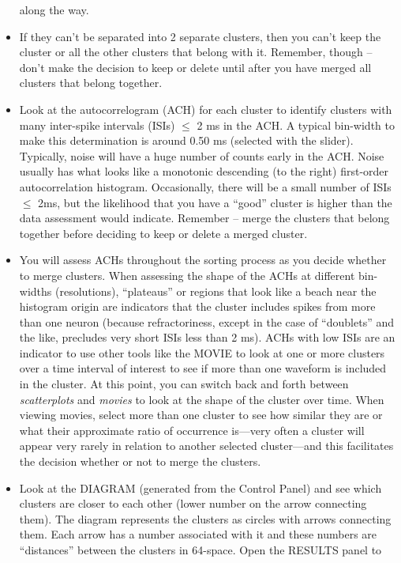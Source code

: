 \documentclass[12pt]{article}
\begin{document}
\begin{itemize}
  along the way.
\item If they can't be separated into 2 separate clusters, then you
  can't keep the cluster or all the other clusters that belong with
  it. Remember, though -- don't make the decision to keep or delete
  until after you have merged all clusters that belong together.
\item Look at the autocorrelogram (ACH) for each cluster to identify
  clusters with many inter-spike intervals (ISIs) ${\leq}$ 2 ms in the
  ACH. A typical bin-width to make this determination is around 0.50
  ms (selected with the slider).  Typically, noise will have a huge
  number of counts early in the ACH. Noise usually has what looks like
  a monotonic descending (to the right) first-order autocorrelation
  histogram. Occasionally, there will be a small number of ISIs
  ${\leq}$ 2ms, but the likelihood that you have a ``good'' cluster is
  higher than the data assessment would indicate.  Remember -- merge
  the clusters that belong together before deciding to keep or delete
  a merged cluster.
\item You will assess ACHs throughout the sorting process as you
  decide whether to merge clusters. When assessing the shape of the
  ACHs at different bin-widths (resolutions), ``plateaus'' or regions
  that look like a beach near the histogram origin are indicators that
  the cluster includes spikes from more than one neuron (because
  refractoriness, except in the case of ``doublets'' and the like,
  precludes very short ISIs less than 2 ms). ACHs with low ISIs are an
  indicator to use other tools like the \textsf{MOVIE} to look at one
  or more clusters over a time interval of interest to see if more
  than one waveform is included in the cluster. At this point, you can
  switch back and forth between \textit{scatterplots} and
  \textit{movies} to look at the shape of the cluster over time. When
  viewing movies, select more than one cluster to see how similar they
  are or what their approximate ratio of occurrence is---very often a
  cluster will appear very rarely in relation to another selected
  cluster---and this facilitates the decision whether or not to merge
  the clusters.
\item Look at the \textsf{DIAGRAM} (generated from the \textsf{Control
    Panel}) and see which clusters are closer to each other (lower
  number on the arrow connecting them). The diagram represents the
  clusters as circles with arrows connecting them. Each arrow has a
  number associated with it and these numbers are ``distances''
  between the clusters in 64-space. Open the \textsf{RESULTS} panel to

\end{itemize}
\end{document}
